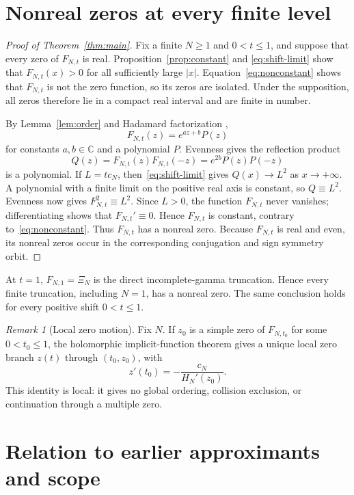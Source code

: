 \documentclass[11pt,a4paper]{amsart}
\theoremstyle{remark}
\newtheorem{remark}[theorem]{Remark}
\newcommand{\C}{\mathbb C}
\begin{document}
\section{Nonreal zeros at every finite level}\label{sec:zeros}

\begin{proof}[Proof of Theorem~\ref{thm:main}]
Fix a finite $N\geq1$ and $0<t\leq1$, and suppose that every zero of
$F_{N,t}$ is real.  Proposition~\ref{prop:constant} and
\eqref{eq:shift-limit} show that $F_{N,t}(x)>0$ for all sufficiently large
$|x|$.  Equation~\eqref{eq:nonconstant} shows that $F_{N,t}$ is not the zero
function, so its zeros are isolated.  Under the supposition, all zeros
therefore lie in a compact real interval and are finite in number.

By Lemma~\ref{lem:order} and Hadamard factorization
\cite[Ch.~2]{Boas1954},
\begin{equation}\label{eq:hadamard}
 F_{N,t}(z)=e^{az+b}P(z)
\end{equation}
for constants $a,b\in\C$ and a polynomial $P$.  Evenness gives
the reflection product
\[
 Q(z)=F_{N,t}(z)F_{N,t}(-z)=e^{2b}P(z)P(-z)
\]
is a polynomial.  If $L=t c_N$, then~\eqref{eq:shift-limit} gives
$Q(x)\to L^2$ as $x\to+\infty$.  A polynomial with a finite limit on the
positive real axis is constant, so $Q\equiv L^2$.  Evenness now gives
$F_{N,t}^2\equiv L^2$.  Since $L>0$, the function $F_{N,t}$ never vanishes;
differentiating shows that $F_{N,t}'\equiv0$.  Hence $F_{N,t}$ is constant,
contrary to~\eqref{eq:nonconstant}.  Thus $F_{N,t}$ has a nonreal zero.
Because $F_{N,t}$ is real and even, its nonreal zeros occur in the
corresponding conjugation and sign symmetry orbit.
\end{proof}

At $t=1$, $F_{N,1}=\Xi_N$ is the direct incomplete-gamma truncation.  Hence
every finite truncation, including $N=1$, has a nonreal zero.  The same
conclusion holds for every positive shift $0<t\leq1$.

\begin{remark}[Local zero motion]\label{rem:motion}
Fix $N$.  If $z_0$ is a simple zero of $F_{N,t_0}$ for some
$0<t_0\leq1$, the holomorphic implicit-function theorem gives a unique local
zero branch $z(t)$ through $(t_0,z_0)$, with
\[
 z'(t_0)=-\frac{c_N}{H_N'(z_0)}.
\]
This identity is local: it gives no global ordering, collision exclusion, or
continuation through a multiple zero.
\end{remark}

\section{Relation to earlier approximants and scope}\label{sec:comparison}
\end{document}
